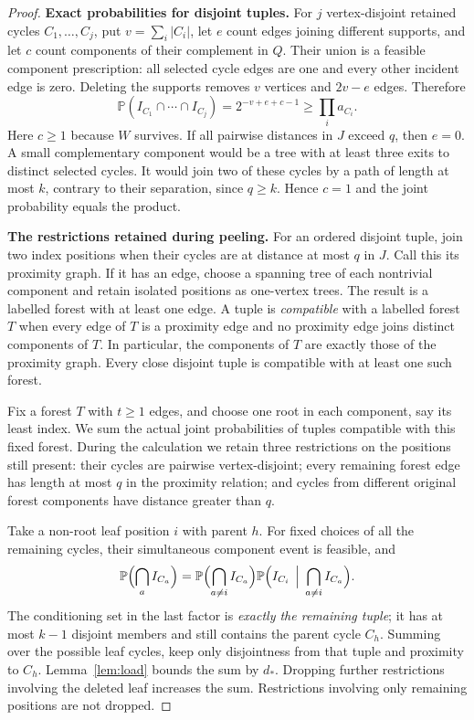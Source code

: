 \documentclass[11pt,a4paper]{article}
\numberwithin{equation}{section}
\theoremstyle{definition}
\theoremstyle{remark}
\newcommand{\Prob}{\mathbb P}
\newcommand{\proofstep}[1]{\par\addvspace{\medskipamount}\noindent\textbf{#1}\enspace\ignorespaces}
\begin{document}
\begin{proof}
\textbf{Exact probabilities for disjoint tuples.}\enspace
For $j$ vertex-disjoint retained cycles $C_1,\ldots,C_j$, put $v=\sum_i|C_i|$, let $e$ count edges joining different supports, and let $c$ count components of their complement in $Q$. Their union is a feasible component prescription: all selected cycle edges are one and every other incident edge is zero. Deleting the supports removes $v$ vertices and $2v-e$ edges. Therefore
\begin{equation}\label{eq:tuple-probability}
 \Prob(I_{C_1}\cap\cdots\cap I_{C_j})=2^{-v+e+c-1}
 \ge\prod_i a_{C_i}.
\end{equation}
Here $c\ge1$ because $W$ survives. If all pairwise distances in $J$ exceed $q$, then $e=0$. A small complementary component would be a tree with at least three exits to distinct selected cycles. It would join two of these cycles by a path of length at most $k$, contrary to their separation, since $q\ge k$. Hence $c=1$ and the joint probability equals the product.

\proofstep{The restrictions retained during peeling.}
For an ordered disjoint tuple, join two index positions when their cycles are at distance at most $q$ in $J$. Call this its proximity graph. If it has an edge, choose a spanning tree of each nontrivial component and retain isolated positions as one-vertex trees. The result is a labelled forest with at least one edge. A tuple is \emph{compatible} with a labelled forest $T$ when every edge of $T$ is a proximity edge and no proximity edge joins distinct components of $T$. In particular, the components of $T$ are exactly those of the proximity graph. Every close disjoint tuple is compatible with at least one such forest.

Fix a forest $T$ with $t\ge1$ edges, and choose one root in each component, say its least index. We sum the actual joint probabilities of tuples compatible with this fixed forest. During the calculation we retain three restrictions on the positions still present: their cycles are pairwise vertex-disjoint; every remaining forest edge has length at most $q$ in the proximity relation; and cycles from different original forest components have distance greater than $q$.

Take a non-root leaf position $i$ with parent $h$. For fixed choices of all the remaining cycles, their simultaneous component event is feasible, and
\[
 \Prob\Bigl(\bigcap_{a} I_{C_a}\Bigr)
 =\Prob\Bigl(\bigcap_{a\ne i} I_{C_a}\Bigr)
   \Prob\Bigl(I_{C_i}\,\Bigm|\,\bigcap_{a\ne i}I_{C_a}\Bigr).
\]
The conditioning set in the last factor is \emph{exactly the remaining tuple}; it has at most $k-1$ disjoint members and still contains the parent cycle $C_h$. Summing over the possible leaf cycles, keep only disjointness from that tuple and proximity to $C_h$. Lemma~\ref{lem:load} bounds the sum by $d_*$. Dropping further restrictions involving the deleted leaf increases the sum. Restrictions involving only remaining positions are not dropped.


\end{proof}
\end{document}
